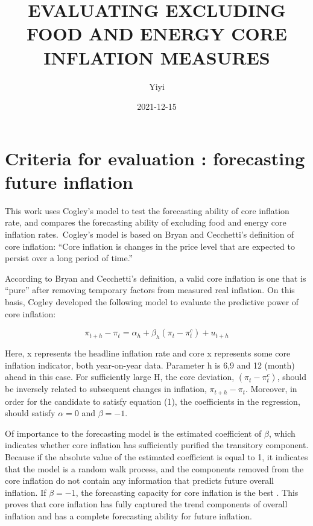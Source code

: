 \documentclass[
]{article}
\title{EVALUATING EXCLUDING FOOD AND ENERGY CORE INFLATION MEASURES}
\author{Yiyi}
\date{2021-12-15}
\begin{document}
\maketitle

\hypertarget{criteria-for-evaluation-forecasting-future-inflation}{%
\section{Criteria for evaluation : forecasting future
inflation}\label{criteria-for-evaluation-forecasting-future-inflation}}

This work uses Cogley's model to test the forecasting ability of core
inflation rate, and compares the forecasting ability of excluding food
and energy core inflation rates.~Cogley's model is based on Bryan and
Cecchetti's definition of core inflation: ``Core inflation is changes in
the price level that are expected to persist over a long period of
time.''

According to Bryan and Cecchetti's definition, a valid core inflation is
one that is ``pure'' after removing temporary factors from measured real
inflation. On this basis, Cogley developed the following model to
evaluate the predictive power of core inflation:

\[\pi_{t+h}-\pi_{t}=\alpha_{h}+\beta_{h}\left(\pi_{t}-\pi_{t}^{c}\right)+u_{t+h}\]

Here, x represents the headline inflation rate and core x represents
some core inflation indicator, both year-on-year data. Parameter h is
6,9 and 12 (month) ahead in this case. For sufficiently large H, the
core deviation, \(\left(\pi_{t}-\pi_{t}^{c}\right)\), should be
inversely related to subsequent changes in inflation,
\(\pi_{t+h}-\pi_{t}\). Moreover, in order for the candidate to satisfy
equation (1), the coefficients in the regression, should satisfy
\(\alpha=0\) and \(\beta = -1\).

Of importance to the forecasting model is the estimated coefficient of
\(\beta\), which indicates whether core inflation has sufficiently
purified the transitory component. Because if the absolute value of the
estimated coefficient is equal to 1, it indicates that the model is a
random walk process, and the components removed from the core inflation
do not contain any information that predicts future overall inflation.
If \(\beta=-1\), the forecasting capacity for core inflation is the best
. This proves that core inflation has fully captured the trend
components of overall inflation and has a complete forecasting ability
for future inflation.
\end{document}
